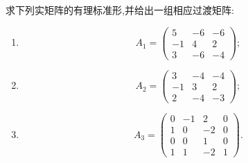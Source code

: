 \begin{example}
求下列实矩阵的有理标准形,并给出一组相应过渡矩阵:
\begin{enumerate}
    \item
    \[
    A_1=
    \begin{pmatrix}
    5&-6&-6\\
    -1&4&2\\
    3&-6&-4
    \end{pmatrix};
    \]
    \item
    \[
    A_2=
    \begin{pmatrix}
    3&-4&-4\\
    -1&3&2\\
    2&-4&-3
    \end{pmatrix};
    \]
    \item
    \[
    A_3=
    \begin{pmatrix}
    0&-1&2&0\\
    1&0&-2&0\\
    0&0&1&0\\
    1&1&-2&1
    \end{pmatrix}.
    \]
\end{enumerate}
\end{example}
\exampleblank

